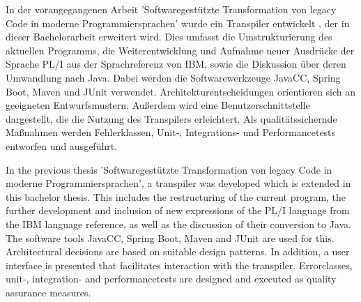 In der vorangegangenen Arbeit 'Softwaregestützte Transformation von legacy Code in moderne Programmiersprachen' wurde ein Transpiler entwickelt , der in dieser Bachelorarbeit erweitert wird.
Dies umfasst die Umstrukturierung des aktuellen Programms, die Weiterentwicklung und Aufnahme neuer Ausdrücke der Sprache PL/I aus der Sprachreferenz von IBM, sowie die Diskussion über deren Umwandlung  nach Java. Dabei werden die Softwarewerkzeuge JavaCC, Spring Boot, Maven und JUnit verwendet. Architekturentscheidungen orientieren sich an geeigneten Entwurfsmustern.
Außerdem wird eine Benutzerschnittstelle dargestellt, die die Nutzung des Transpilers erleichtert. Als qualitätssichernde Maßnahmen werden Fehlerklassen, Unit-, Integrations- und Performancetests entworfen und ausgeführt.

In the previous thesis 'Softwaregestützte Transformation von legacy Code in moderne Programmiersprachen', a transpiler was developed which is extended in this bachelor thesis.
This includes the restructuring of the current program, the further development and inclusion of new expressions of the PL/I language from the IBM language reference, as well as the discussion of their conversion to Java. The software tools JavaCC, Spring Boot, Maven and JUnit are used for this. Architectural decisions are based on suitable design patterns.
In addition, a user interface is presented that facilitates interaction with the transpiler. Errorclasses, unit-, integration- and performancetests are designed and executed as quality assurance measures.


